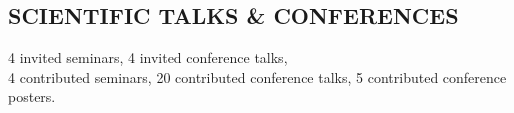 \documentclass[letter, margin, 10pt]{res} %
\begin{document}
\begin{resume}

\parskip \baselineskip
\vspace{-6pt}
\section{SCIENTIFIC TALKS \& CONFERENCES}
4 invited seminars, 4 invited conference talks,\\
4 contributed seminars, 20 contributed conference talks, 5 contributed conference posters.


\end{resume}
\end{document}
